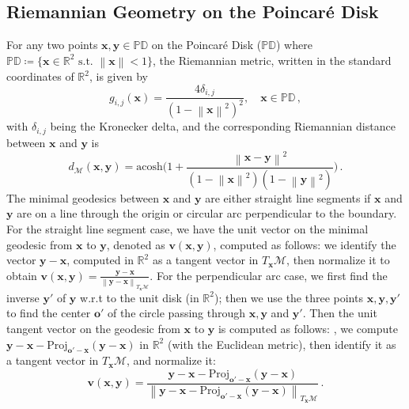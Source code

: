 \documentclass[11pt]{article}
\newcommand{\mbf}[1]{\boldsymbol{#1}}
\newcommand{\norm}[1]{\left\| #1 \right\|}
\newcommand{\R}{\mathbb{R}}
\newcommand{\bo}{\mbf{o}}
\newcommand{\bv}{\mbf{v}}
\newcommand{\bx}{\mbf{x}}
\newcommand{\by}{\mbf{y}}
\newcommand{\mM}{\mathcal{M}}
\begin{document}
\subsection{Riemannian Geometry on the Poincar\'{e} Disk}
%
For any two points $\bx, \by \in \mathbb{PD}$ on the Poincar\'{e} Disk ($\mathbb{PD}$) where $\mathbb{PD} \coloneqq \{\bx \in \R^2  \text{ s.t. } \norm{\bx} < 1\}$, the Riemannian metric, written in the standard coordinates of $\R^2$, is given by
\[
g_{i, j}(\bx) = \frac{4\delta_{i, j}}{(1 - \norm{\bx}^2)^2}, \quad \bx \in \mathbb{PD}\,,
\]
with $\delta_{i, j}$ being the Kronecker delta, and the corresponding Riemannian distance between $\bx$ and $\by$ is
\[
d_{\mM}(\bx, \by) = \text{acosh}\bigg(1 + \frac{\norm{\bx - \by}^2}{(1 - \norm{\bx}^2)(1 - \norm{\by}^2)}\bigg)\,.
\]
The minimal geodesics between $\bx$ and $\by$ are either straight line segments if $\bx$ and $\by$ are on a line through the origin or circular arc perpendicular to the boundary.  For the straight line segment case, we have the unit vector on the minimal geodesic from $\bx$ to $\by$, denoted as $\bv(\bx, \by)$, computed as follows: we identify the vector $\by - \bx$, computed in $\R^2$ as a tangent vector in $T_{\bx}\mM$, then normalize it to obtain $\bv(\bx, \by) = \frac{\by - \bx}{\norm{\by - \bx}_{T_{\bx}\mM}}$.  For the perpendicular arc case, we first find the inverse $\by'$ of $\by$ w.r.t to the unit disk (in $\R^2$); then we use the three points $\bx, \by, \by'$ to find the center $\bo'$ of the circle passing through $\bx, \by$ and $\by'$. Then the unit tangent vector on the geodesic from $\bx$ to $\by$ is computed as follows: , we compute $\by - \bx - \text{Proj}_{\bo' -\bx}(\by - \bx)$ in $\R^2$ (with the Euclidean metric), then identify it as a tangent vector in $T_{\bx}\mM$, and normalize it:
\[
\bv(\bx, \by) = \frac{\by - \bx - \text{Proj}_{\bo' -\bx}(\by - \bx)}{\norm{\by - \bx - \text{Proj}_{\bo' -\bx}(\by - \bx)}_{T_{\bx}\mM}}\,.
\]
%
\end{document}
